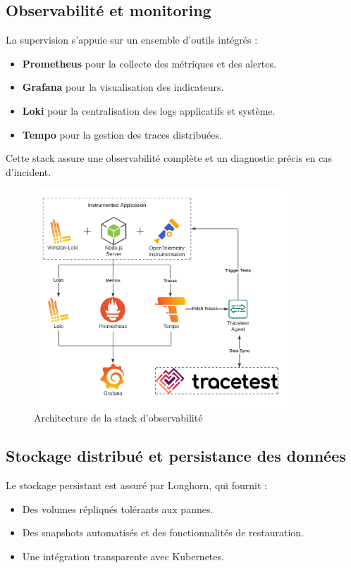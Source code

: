 \subsection{Observabilité et monitoring}

La supervision s'appuie sur un ensemble d’outils intégrés :

\begin{itemize}
	\item \textbf{Prometheus} pour la collecte des métriques et des alertes.
	\item \textbf{Grafana} pour la visualisation des indicateurs.
	\item \textbf{Loki} pour la centralisation des logs applicatifs et système.
	\item \textbf{Tempo} pour la gestion des traces distribuées.
\end{itemize}

Cette stack assure une observabilité complète et un diagnostic précis en cas d’incident.

\begin{figure}[H]
	\centering
	\includegraphics[width=0.85\textwidth]{figures/observabilite-stack.png}
	\caption{Architecture de la stack d'observabilité}
\end{figure}

\subsection{Stockage distribué et persistance des données}

Le stockage persistant est assuré par Longhorn, qui fournit :
\begin{itemize}
	\item Des volumes répliqués tolérants aux pannes.
	\item Des snapshots automatisés et des fonctionnalités de restauration.
	\item Une intégration transparente avec Kubernetes.
\end{itemize}


